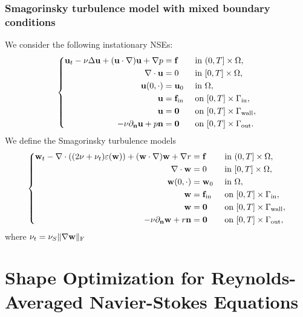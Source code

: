 \documentclass[oneside,11pt]{book}
\numberwithin{equation}{section}
\begin{document}
\section{Smagorinsky turbulence model with mixed boundary conditions}
We consider the following instationary NSEs:
\begin{equation}
    \label{instationary NSEs mixed BCs}
    \left\{\begin{split}
        {\bf u}_t - \nu\Delta{\bf u} + ({\bf u}\cdot\nabla){\bf u} + \nabla p &= {\bf f} &&\mbox{ in } (0,T]\times\Omega,\\
        \nabla\cdot{\bf u} &= 0 &&\mbox{ in } [0,T]\times\Omega,\\
        {\bf u}(0,\cdot) &= {\bf u}_0 &&\mbox{ in } \Omega,\\
        {\bf u} &= {\bf f}_{\rm in} &&\mbox{ on } [0,T]\times\Gamma_{\rm in},\\
        {\bf u} &= {\bf 0} &&\mbox{ on } [0,T]\times\Gamma_{\rm wall},\\
        -\nu\partial_{\bf n}{\bf u} + p{\bf n} &= {\bf 0} &&\mbox{ on } [0,T]\times\Gamma_{\rm out}.
    \end{split}\right.
\end{equation}
We define the Smagorinsky turbulence models
\begin{equation}
    \label{Smagorinsky mixed BCs}
    \left\{\begin{split}
        {\bf w}_t - \nabla\cdot((2\nu + \nu_t)\varepsilon({\bf w})) + ({\bf w}\cdot\nabla){\bf w} + \nabla r &= {\bf f} &&\mbox{ in } (0,T]\times\Omega,\\
        \nabla\cdot{\bf w} &= 0 &&\mbox{ in } [0,T]\times\Omega,\\
        {\bf w}(0,\cdot) &= {\bf w}_0 &&\mbox{ in } \Omega,\\
        {\bf w} &= {\bf f}_{\rm in} &&\mbox{ on } [0,T]\times\Gamma_{\rm in},\\
        {\bf w} &= {\bf 0} &&\mbox{ on } [0,T]\times\Gamma_{\rm wall},\\
        -\nu\partial_{\bf n}{\bf w} + r{\bf n} &= {\bf 0} &&\mbox{ on } [0,T]\times\Gamma_{\rm out},
    \end{split}\right.
\end{equation}
where $\nu_t = \nu_S\|\nabla{\bf w}\|_{\rm F}$


\part{Shape Optimization for Reynolds-Averaged Navier-Stokes Equations}
\end{document}
